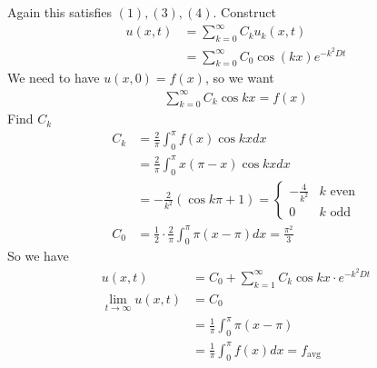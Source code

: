 \documentclass[12pt, letterpaper]{article}
\begin{document}
\begin{enumerate}
    Again this satisfies $(1),(3),(4)$. Construct
    \begin{align*}
        u(x,t) &= \sum_{k=0}^{\infty} C_ku_k(x,t)  \\
        &= \sum_{k=0}^{\infty} C_0 \cos (kx) e^{-k^2Dt}
    \end{align*} 
    We need to have $u(x,0) = f(x)$, so we want 
    \begin{align*}
        \sum_{k=0}^{\infty} C_k \cos kx = f(x)
    \end{align*}
    Find $C_k$
    \begin{align*}
        C_k &= \frac{2}{\pi}\int_{0}^{\pi}f(x)\cos kx dx \\
        &= \frac 2\pi \int_{0}^{\pi} x(\pi-x) \cos kx dx \\
        &= -\frac{2}{k^2} (\cos k\pi + 1) = \begin{cases}
            -\frac{4}{k^2} & k \text{ even} \\
            0 & k \text{ odd}
        \end{cases} \\
        C_0 &= \frac 12 \cdot \frac 2\pi \int_{0}^{\pi} \pi(x-\pi) dx = \frac{\pi^2}{3}
    \end{align*}
    So we have
    \begin{align*}
        u(x,t) &= C_0 + \sum_{k=1}^{\infty} C_k \cos kx \cdot e^{-k^2Dt} \\
        \lim_{t\rightarrow \infty} u(x,t) &= C_0  \\
        &= \frac{1}{\pi} \int_{0}^{\pi}\pi(x-\pi) \\
        &= \frac 1\pi \int_{0}^{\pi}f(x) dx = f_{\text{avg}}
    \end{align*}
\end{enumerate}
\end{document}
